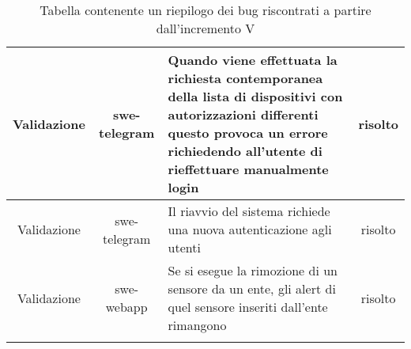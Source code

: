 \begin{center}
\begin{longtable}{|c|c|p{8cm}|c|}
	    \hline
	    Validazione & swe-telegram & Quando viene effettuata la richiesta contemporanea della lista di dispositivi con autorizzazioni differenti questo provoca un errore richiedendo all'utente di rieffettuare manualmente login  & risolto \\
	    \hline
	    Validazione & swe-telegram & Il riavvio del sistema richiede una nuova autenticazione agli utenti & risolto \\
	    \hline
	    Validazione & swe-webapp & Se si esegue la rimozione di un sensore da un ente, gli alert di quel sensore inseriti dall'ente rimangono & risolto \\
	    \hline


		 \caption{Tabella contenente un riepilogo dei bug riscontrati a partire dall'incremento V}
		\end{longtable}
	\end{center}
		